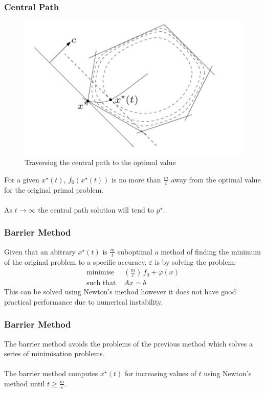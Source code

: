 \documentclass{beamer}
\begin{document}
\begin{frame}
    \frametitle{Central Path}
    \begin{figure}[t]
        \centering
        \includegraphics[scale=0.25]{central_path}
        \caption{Traversing the central path to the optimal value}
        \label{fig:<+label+>}
    \end{figure}
    \vspace{-5mm}
    For a given $x^{\star}(t)$, $f_{0}(x^{\star}(t))$ is no more than
    $\frac{m}{t}$ away from the optimal value for the original primal problem.
    \\~\\
    As $t \rightarrow \infty$ the central path solution will tend to
    $p^{\star}$.
\end{frame}

\begin{frame}
    \frametitle{Barrier Method}
    Given that an abitrary $x^{\star}(t)$ is $\frac{m}{t}$ suboptimal a method of
    finding the minimum of the original problem to a specific accuracy,
    $\varepsilon$ is by solving the problem:
    \begin{align*}
        \text{minimise } \, &\left(\frac{m}{\varepsilon}\right)\,f_{0} +
        \varphi(x)\\
        \text{such that } & Ax =b
    \end{align*}
    This can be solved using Newton's method however it does not have good
    practical performance due to numerical instability.
\end{frame}

\begin{frame}
    \frametitle{Barrier Method}
    The barrier method avoids the problems of the previous method which solves a
    series of minimisation problems.
    \\~\\
    The barrier method computes $x^{\star}(t)$ for increasing values of
    $t$ using Newton's method until $t \geq \frac{m}{\varepsilon}$.
\end{frame}
\end{document}
